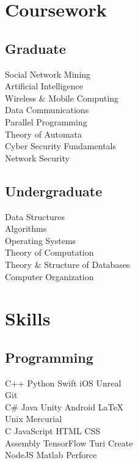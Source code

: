 \documentclass[]{deedy_resume}
\begin{document}
\begin{minipage}[t]{0.36\textwidth}

\section{Coursework}
\subsection{Graduate}
Social Network Mining \\
Artificial Intelligence \\
Wireless \& Mobile Computing \\
Data Communications \\
Parallel Programming \\
Theory of Automata \\
Cyber Security Fundamentals \\
Network Security \\
\sectionsep

\subsection{Undergraduate}
Data Structures \\
Algorithms \\
Operating Systems \\
Theory of Computation \\
Theory \& Structure of Databases \\
Computer Organization \\
\sectionsep


\section{Skills}
\subsection{Programming}
C++ \textbullet{} Python \textbullet{} Swift \textbullet{} iOS \textbullet{} Unreal \\
\textbullet{} Git \\
C\# \textbullet{} Java \textbullet{} Unity \textbullet{} Android \textbullet{} \LaTeX\ \\
Unix \textbullet{} Mercurial \\
C \textbullet{} JavaScript \textbullet{} HTML\textbullet{} CSS \\ Assembly \textbullet{} TensorFlow \textbullet{} Turi Create \\ NodeJS \textbullet{} Matlab \textbullet{} Perforce \\
\sectionsep

%
%

\end{minipage} 
\end{document}
